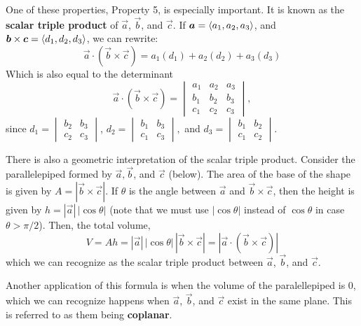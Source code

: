 One of these properties, Property 5, is especially important. It is known as the \textbf{scalar triple product} of \(\vec a\), \(\vec b\), and \(\vec c\). If \(\boldsymbol{a} = \left\langle a_1,a_2,a_3\right\rangle\), and \(\boldsymbol{b} \times \boldsymbol{c} =\left\langle d_1, d_2,d_3\right\rangle\), we can rewrite:
\[\vec a \cdot (\vec b \times \vec c) = a_1(d_1)+a_2(d_2)+a_3(d_3)\]
Which is also equal to the determinant
\[ \vec a \cdot (\vec b \times \vec c)=\begin{vmatrix}
    a_1 & a_2 & a_3 \\
    b_1 & b_2 & b_3 \\
    c_1 & c_2 & c_3
\end{vmatrix}, \]
since \( d_1=\begin{vmatrix}
    b_2 & b_3 \\
    c_2 & c_3
\end{vmatrix} \), \(d_2 = \begin{vmatrix}
    b_1 & b_3 \\
    c_1 & c_3
\end{vmatrix},\) and \(d_3 = \begin{vmatrix}
    b_1 & b_2 \\
    c_1 & c_2
\end{vmatrix}\). \par
There is also a geometric interpretation of the scalar triple product. Consider the parallelepiped formed by \(\vec a, \vec b\), and \(\vec c\) (below).
The area of the base of the shape is given by \(A=|\vec b\times \vec c|\). If \(\theta\) is the angle between \(\vec a\) and \(\vec b\times \vec c\), then the height is given by \(h=|\vec a|\, |\cos\theta|\) (note that we must use \(|\cos\theta|\) instead of \(\cos \theta\) in case \(\theta>\pi/2\)). Then, the total volume,
\[V=Ah=|\vec a|\,|\cos\theta|\,|\vec b \times \vec c| = |\vec a \cdot (\vec b \times \vec c)|\]
which we can recognize as the scalar triple product between \(\vec a\), \(\vec b\), and \(\vec c\). \par 
Another application of this formula is when the volume of the paralellepiped is \(0\), which we can recognize happens when \(\vec a\), \(\vec b\), and \(\vec c\) exist in the same plane. This is referred to as them being \textbf{coplanar}.
